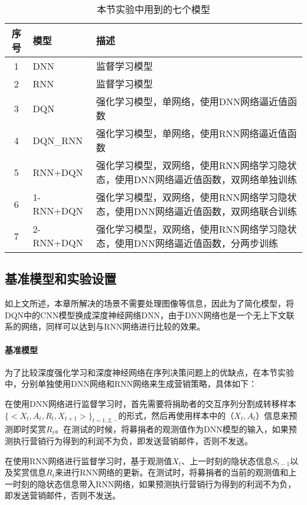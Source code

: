  \begin{table}[htbp]
  \centering
  \caption{本节实验中用到的七个模型}
  \label{tab:4modesl}
  \begin{tabular}{clp{10cm}}  
    \toprule
      序号 & 模型 & 描述 \\
    \midrule
      1 & DNN & 监督学习模型\\
      2 & RNN & 监督学习模型\\
      3 & DQN & 强化学习模型，单网络，使用DNN网络逼近值函数\\
      4 & DQN_RNN & 强化学习模型，单网络，使用RNN网络逼近值函数\\
      \hline
      \hline
      5 & RNN+DQN & 强化学习模型，双网络，使用RNN网络学习隐状态，使用DNN网络逼近值函数，双网络单独训练\\
      6 & 1-RNN+DQN & 强化学习模型，双网络，使用RNN网络学习隐状态，使用DNN网络逼近值函数，双网络联合训练\\
      7 & 2-RNN+DQN & 强化学习模型，双网络，使用RNN网络学习隐状态，使用DNN网络逼近值函数，分两步训练 \\           
    \bottomrule
  \end{tabular}
\end{table}
% 
\subsection{基准模型和实验设置}
如上文所述，本章所解决的场景不需要处理图像等信息，因此为了简化模型，将DQN中的CNN模型换成深度神经网络DNN，由于DNN网络也是一个无上下文联系的网络，同样可以达到与RNN网络进行比较的效果。

\paragraph{基准模型}
为了比较深度强化学习和深度神经网络在序列决策问题上的优缺点，在本节实验中，分别单独使用DNN网络和RNN网络来生成营销策略，具体如下：

在使用DNN网络进行监督学习时，首先需要将捐助者的交互序列分割成转移样本$\{<X_{t},A_{t},R_{t},X_{t+1}>\}_{t=1,2,\cdots}$的形式，然后再使用样本中的（$X_{t},A_{t}$）信息来预测即时奖赏$R_{t}$。在测试的时候，将募捐者的观测值作为DNN模型的输入，如果预测执行营销行为得到的利润不为负，即发送营销邮件，否则不发送。

在使用RNN网络进行监督学习时，基于观测值$X_{t}$、上一时刻的隐状态信息$S_{t-1}$以及奖赏信息$R_{t}$来进行RNN网络的更新。在测试时，将募捐者的当前的观测值和上一时刻的隐状态信息带入RNN网络，如果预测执行营销行为得到的利润不为负，即发送营销邮件，否则不发送。

